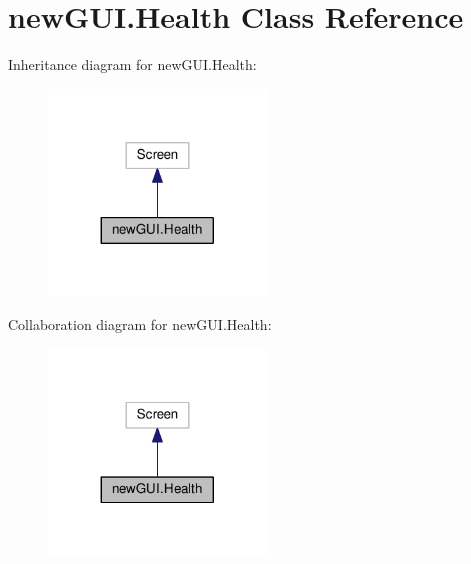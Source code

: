 \hypertarget{classnewGUI_1_1Health}{}\section{new\+G\+U\+I.\+Health Class Reference}
\label{classnewGUI_1_1Health}


Inheritance diagram for new\+G\+U\+I.\+Health\+:
\nopagebreak
\begin{figure}[H]
\begin{center}
\leavevmode
\includegraphics[width=164pt]{classnewGUI_1_1Health__inherit__graph}
\end{center}
\end{figure}


Collaboration diagram for new\+G\+U\+I.\+Health\+:
\nopagebreak
\begin{figure}[H]
\begin{center}
\leavevmode
\includegraphics[width=164pt]{classnewGUI_1_1Health__coll__graph}
\end{center}
\end{figure}

